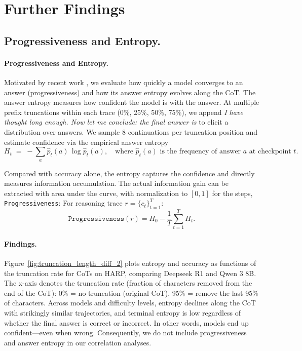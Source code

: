 \section{Further Findings}\label{append:further}

\subsection{Progressiveness and Entropy.}

\paragraph{Progressiveness and Entropy.}
Motivated by recent work \citep{wu2025knowledge}, we evaluate how quickly a model converges to an answer (progressiveness) and how its answer entropy evolves along the CoT. The answer entropy measures how confident the model is with the answer. At multiple prefix truncations within each trace (0\%, 25\%, 50\%, 75\%), we append
\textit{I have thought long enough. Now let me conclude: the final answer is}
to elicit a distribution over answers. We sample 8 continuations per truncation position and estimate confidence via the empirical answer entropy
\[
H_t \;=\; -\sum_{a} \hat{p}_t(a)\,\log \hat{p}_t(a),
\quad\text{where } \hat{p}_t(a) \text{ is the frequency of answer } a \text{ at checkpoint } t.
\]

Compared with accuracy alone, the entropy captures the confidence and directly measures information accumulation. The actual information gain can be extracted with area under the curve, with normalization to $[0, 1]$ for the steps, 
\texttt{Progressiveness}: For reasoning trace $r=\{c_t\}_{t=1}^{T}$:
    \begin{equation}
        \texttt{Progressiveness}(r) = H_0 - \frac{1}{T}\sum_{t=1}^{T}H_t.
    \end{equation}

\paragraph{Findings.} Figure~\ref{fig:truncation_length_diff_2} plots entropy and accuracy as functions of the truncation rate for CoTs on HARP, comparing Deepseek R1 and Qwen 3 8B. The x-axis denotes the truncation rate (fraction of characters removed from the end of the CoT): 0\% = no truncation (original CoT), 95\% = remove the last 95\% of characters. Across models and difficulty levels, entropy declines along the CoT with strikingly similar trajectories, and terminal entropy is low regardless of whether the final answer is correct or incorrect. In other words, models end up confident—even when wrong. Consequently, we do not include progressiveness and answer entropy in our correlation analyses.

